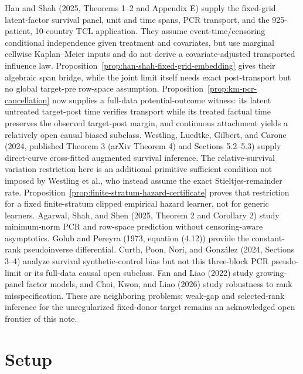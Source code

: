 \documentclass{article}
\begin{document}
Han and Shah (2025, Theorems 1--2 and Appendix E) supply the fixed-grid latent-factor survival panel, unit and time spans, PCR transport, and the 925-patient, 10-country TCL application. They assume event-time/censoring conditional independence given treatment and covariates, but use marginal cellwise Kaplan--Meier inputs and do not derive a covariate-adjusted transported influence law. Proposition~\ref{prop:han-shah-fixed-grid-embedding} gives their algebraic span bridge, while the joint limit itself needs exact post-transport but no global target-pre row-space assumption. Proposition~\ref{prop:km-pcr-cancellation} now supplies a full-data potential-outcome witness: its latent untreated target-post time verifies transport while its treated factual time preserves the observed target-post margin, and continuous attachment yields a relatively open causal biased subclass. Westling, Luedtke, Gilbert, and Carone (2024, published Theorem 3 (arXiv Theorem 4) and Sections 5.2--5.3) supply direct-curve cross-fitted augmented survival inference. The relative-survival variation restriction here is an additional primitive sufficient condition not imposed by Westling et al., who instead assume the exact Stieltjes-remainder rate. Proposition~\ref{prop:finite-stratum-hazard-certificate} proves that restriction for a fixed finite-stratum clipped empirical hazard learner, not for generic learners. Agarwal, Shah, and Shen (2025, Theorem 2 and Corollary 2) study minimum-norm PCR and row-space prediction without censoring-aware asymptotics. Golub and Pereyra (1973, equation (4.12)) provide the constant-rank pseudoinverse differential. Curth, Poon, Nori, and Gonz\'alez (2024, Sections 3--4) analyze survival synthetic-control bias but not this three-block PCR pseudo-limit or its full-data causal open subclass. Fan and Liao (2022) study growing-panel factor models, and Choi, Kwon, and Liao (2026) study robustness to rank misspecification. These are neighboring problems; weak-gap and selected-rank inference for the unregularized fixed-donor target remains an acknowledged open frontier of this note.

\section{Setup}
\end{document}
